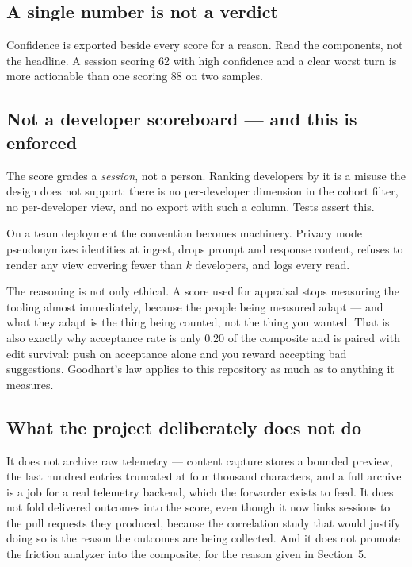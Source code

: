 \documentclass[11pt,a4paper]{article}
\begin{document}
\subsection{A single number is not a verdict}

Confidence is exported beside every score for a reason. Read the components, not
the headline. A session scoring 62 with high confidence and a clear worst turn
is more actionable than one scoring 88 on two samples.

\subsection{Not a developer scoreboard --- and this is enforced}

The score grades a \emph{session}, not a person. Ranking developers by it is a
misuse the design does not support: there is no per-developer dimension in the
cohort filter, no per-developer view, and no export with such a column. Tests
assert this.

On a team deployment the convention becomes machinery. Privacy mode
pseudonymizes identities at ingest, drops prompt and response content, refuses
to render any view covering fewer than $k$ developers, and logs every read.

The reasoning is not only ethical. A score used for appraisal stops measuring
the tooling almost immediately, because the people being measured adapt --- and
what they adapt is the thing being counted, not the thing you wanted. That is
also exactly why acceptance rate is only 0.20 of the composite and is paired
with edit survival: push on acceptance alone and you reward accepting bad
suggestions. Goodhart's law applies to this repository as much as to anything
it measures.

\subsection{What the project deliberately does not do}

It does not archive raw telemetry --- content capture stores a bounded preview,
the last hundred entries truncated at four thousand characters, and a full
archive is a job for a real telemetry backend, which the forwarder exists to
feed. It does not fold delivered outcomes into the score, even though it now
links sessions to the pull requests they produced, because the correlation study
that would justify doing so is the reason the outcomes are being collected. And
it does not promote the friction analyzer into the composite, for the reason
given in Section~5.
\end{document}
